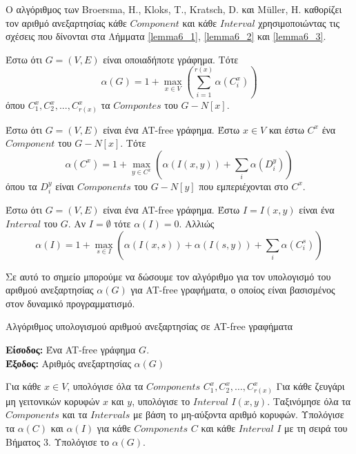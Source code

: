 Ο αλγόριθμος των Broersma, H., Kloks, T., Kratsch, D. και Müller, H. καθορίζει τον αριθμό ανεξαρτησίας κάθε $Component$ και κάθε $Interval$ χρησιμοποιώντας τις σχέσεις που δίνονται στα Λήμματα \ref{lemma6_1}, \ref{lemma6_2} και \ref{lemma6_3}.

\begin{lemma}
	\label{lemma6_1}
	Έστω ότι $G = (V,E)$ είναι οποιαδήποτε γράφημα. 
	Τότε $$\alpha(G)=1+\max_{x\in V}\left(\sum_{i=1}^{r(x)}\alpha(C_i^x)\right)$$ όπου  $C_1^x, C_2^x,...,C_{r(x)}^x$ τα $Compontes$ του $G - N[x]$.
\end{lemma}

\begin{lemma}
	\label{lemma6_2}
	Έστω ότι $G = (V,E)$ είναι ένα AT-free γράφημα. Έστω $x \in V$ και έστω $C^x$ ένα $Component$ του $G - N[x]$. Τότε $$\alpha(C^x)=1+\max_{y\in C^x}\left(\alpha(I(x,y))+\sum_{i}\alpha(D_i^y)\right)$$ όπου τα $D_i^y$ είναι $Components$ του $G - N[y]$ που εμπεριέχονται στο $C^x$. 
\end{lemma}

\begin{lemma}
	\label{lemma6_3}
	Έστω ότι $G = (V,E)$ είναι ένα AT-free γράφημα. Έστω $I = I(x,y)$ είναι ένα $Interval$ του $G$. Αν $I = \emptyset$ τότε $\alpha(I) = 0$. Αλλιώς $$\alpha(I)=1+\max_{s\in I}\left(\alpha(I(x,s))+\alpha(I(s,y))+\sum_{i}\alpha(C_i^s)\right)$$
\end{lemma}

Σε αυτό το σημείο μπορούμε να δώσουμε τον αλγόριθμο για τον υπολογισμό του αριθμού ανεξαρτησίας $\alpha(G)$ για AT-free γραφήματα, ο οποίος είναι βασισμένος στον δυναμικό προγραμματισμό. 

\begin{algorithm}[H]
	\caption{Αλγόριθμος υπολογισμού αριθμού ανεξαρτησίας σε AT-free γραφήματα}
	\label{alg:indep-set}
	
	\hspace*{\algorithmicindent} \textbf{Είσοδος:} Ένα AT-free γράφημα $G$.\\
	
	\hspace*{\algorithmicindent} \textbf{Έξοδος:} Αριθμός ανεξαρτησίας $\alpha(G)$
	
	\begin{algorithmic}[1]
		
		\STATE Για κάθε $x \in V$, υπολόγισε όλα τα $Components$ $C_1^x , C_2^x , \ldots , C_{r(x)}^x$
		\STATE Για κάθε ζευγάρι μη γειτονικών κορυφών $x$ και $y$, υπολόγισε το $Interval$ $I(x, y)$.
		\STATE Ταξινόμησε όλα τα $Components$ και τα $Intervals$ με βάση το μη-αύξοντα αριθμό κορυφών.
		\STATE Υπολόγισε τα $\alpha(C)$ και $\alpha(I)$ για κάθε $Components$ $C$ και κάθε $Interval$ $I$ με τη σειρά του Βήματος 3.
		\STATE Υπολόγισε το $\alpha(G)$.
		
	\end{algorithmic}
\end{algorithm}

